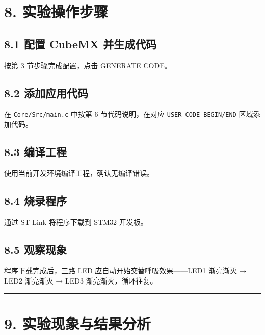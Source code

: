 \documentclass[
  chinese,
  UTF8,
  oneside,
  openany]{ctexbook}
\begin{document}
\section{8. 实验操作步骤}\label{ux5b9eux9a8cux64cdux4f5cux6b65ux9aa4-4}

\subsection{8.1 配置 CubeMX
并生成代码}\label{ux914dux7f6e-cubemx-ux5e76ux751fux6210ux4ee3ux7801-1}

按第 3 节步骤完成配置，点击 GENERATE CODE。

\subsection{8.2
添加应用代码}\label{ux6dfbux52a0ux5e94ux7528ux4ee3ux7801-1}

在 \texttt{Core/Src/main.c} 中按第 6 节代码说明，在对应
\texttt{USER\ CODE\ BEGIN/END} 区域添加代码。

\subsection{8.3 编译工程}\label{ux7f16ux8bd1ux5de5ux7a0b-4}

使用当前开发环境编译工程，确认无编译错误。

\subsection{8.4 烧录程序}\label{ux70e7ux5f55ux7a0bux5e8f-4}

通过 ST-Link 将程序下载到 STM32 开发板。

\subsection{8.5 观察现象}\label{ux89c2ux5bdfux73b0ux8c61-1}

程序下载完成后，三路 LED 应自动开始交替呼吸效果------LED1 渐亮渐灭 →
LED2 渐亮渐灭 → LED3 渐亮渐灭，循环往复。

\begin{center}\rule{0.5\linewidth}{0.5pt}\end{center}

\section{9.
实验现象与结果分析}\label{ux5b9eux9a8cux73b0ux8c61ux4e0eux7ed3ux679cux5206ux6790-4}
\end{document}
